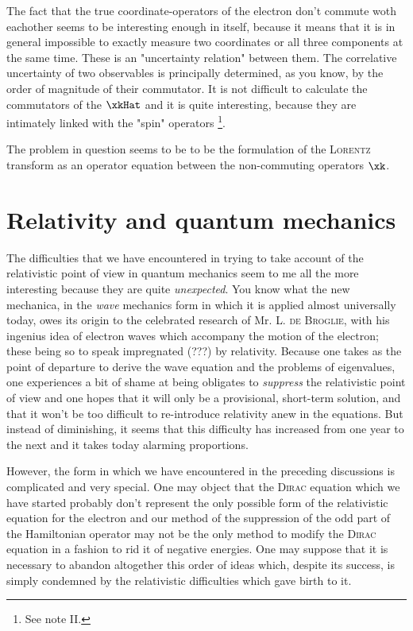 \documentclass{article}
\renewcommand{\it}[1]{\textit{#1}}
\renewcommand{\sc}[1]{\textsc{#1}}
\begin{document}
The fact that the true coordinate-operators of the electron don't commute woth eachother seems to be interesting enough in itself, because it means that it is in general impossible to exactly measure two coordinates or all three components at the same time. These is an "uncertainty relation" between them. The correlative uncertainty of two observables is principally determined, as you know, by the order of magnitude of their commutator. It is not difficult to calculate the commutators of the $\xkHat$ and it is quite interesting, because they are intimately linked with the "spin" operators \footnote{See note II.}.

The problem in question seems to be to be the formulation of the \sc{Lorentz} transform as an operator equation between the non-commuting operators $\xk$.

\section{Relativity and quantum mechanics}

The difficulties that we have encountered in trying to take account of the relativistic point of view in quantum mechanics seem to me all the more interesting because they are quite \it{unexpected}. You know what the new mechanica, in the \it{wave} mechanics form in which it is applied almost universally today, owes its origin to the celebrated research of Mr. \sc{L. de Broglie}, with his ingenius idea of electron waves which accompany the motion of the electron; these being so to speak impregnated (???) by relativity. Because one takes as the point of departure to derive the wave equation and the problems of eigenvalues, one experiences a bit of shame at being obligates to \it{suppress} the relativistic point of view and one hopes that it will only be a provisional, short-term solution, and that it won't be too difficult to re-introduce relativity anew in the equations. But instead of diminishing, it seems that this difficulty has increased from one year to the next and it takes today alarming proportions.

However, the form in which we have encountered in the preceding discussions is complicated and very special. One may object that the \sc{Dirac} equation which we have started probably don't represent the only possible form of the relativistic equation for the electron and our method of the suppression of the odd part of the Hamiltonian operator may not be the only method to modify the \sc{Dirac} equation in a fashion to rid it of negative energies. One may suppose that it is necessary to abandon altogether this order of ideas which, despite its success, is simply condemned by the relativistic difficulties which gave birth to it.
\end{document}
